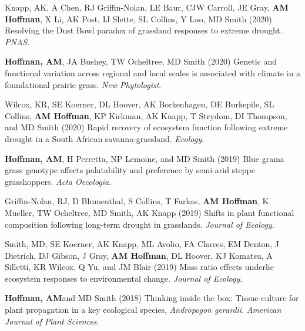 \documentclass{cv}
\begin{document}
\begin{pubenum}
\item Knapp, AK, A Chen, RJ Griffin-Nolan, LE Baur, CJW Carroll, JE Gray, \textbf{AM Hoffman}, X Li, AK Post, IJ Slette, SL Collins, Y Luo, MD Smith (2020) Resolving the Dust Bowl paradox of grassland responses to extreme drought. \textit{PNAS}. 

\item\textbf{Hoffman, AM}\footnotemark[1], JA Bushey, TW Ocheltree, MD Smith (2020) Genetic and functional variation across regional and local scales is associated with climate in a foundational prairie grass. \textit{New Phytologist}. 

\item Wilcox, KR, SE Koerner, DL Hoover, AK Borkenhagen, DE Burkepile, SL Collins, \textbf{AM Hoffman}, KP Kirkman, AK Knapp, T Strydom, DI Thompson, and MD Smith (2020) Rapid recovery of ecosystem function following extreme drought in a South African savanna-grassland. \textit{Ecology}. 

\item\textbf{Hoffman, AM}\footnotemark[1], H Perretta\footnotemark[2], NP Lemoine, and MD Smith (2019) Blue grama grass genotype affects palatability and preference by semi-arid steppe grasshoppers. \textit{Acta Oecologia}. 


\item Griffin-Nolan, RJ, D Blumenthal, S Collins, T Farkas, \textbf{AM Hoffman}, K Mueller, TW Ocheltree, MD Smith, AK Knapp (2019) Shifts in plant functional composition following long-term drought in grasslands. \textit{Journal of Ecology}. 

\item Smith, MD, SE Koerner, AK Knapp, ML Avolio, FA Chaves, EM Denton, J Dietrich, DJ Gibson, J Gray, \textbf{AM Hoffman}, DL Hoover, KJ Komatsu, A Silletti, KR Wilcox, Q Yu, and JM Blair (2019) Mass ratio effects underlie ecosystem responses to environmental change. \textit{Journal of Ecology}. 

\item\textbf{Hoffman, AM}\footnotemark[1] and MD Smith (2018) Thinking inside the box: Tissue culture for plant propagation in a key ecological species, \textit{Andropogon gerardii}. \textit{American Journal of Plant Sciences}.  


\end{pubenum}
\end{document}
